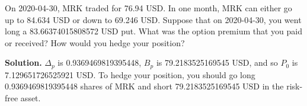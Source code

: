 \noindent On 2020-04-30, MRK traded for 76.94 USD. In one month, MRK can either go up to 84.634 USD or down to 69.246 USD. Suppose that on 2020-04-30, you went long a 83.66374015808572 USD put. What was the option premium that you paid or received? How would you hedge your position?

\vspace{9pt}

\noindent\textbf{Solution.} $\Delta_{p}$ is 0.9369469819395448, $B_{p}$ is 79.2183525169545 USD, and so $P_{0}$ is 7.129651726525921 USD. To hedge your position, you should go long 0.9369469819395448 shares of MRK and short 79.2183525169545 USD in the risk-free asset.